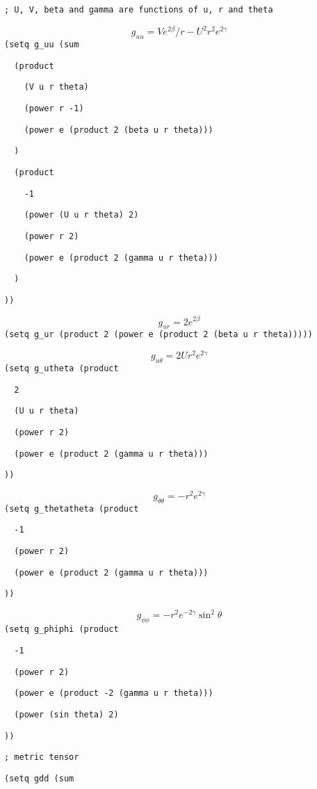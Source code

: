 {\tt ;\ U,\ V,\ beta\ and\ gamma\ are\ functions\ of\ u,\ r\ and\ theta}

$$g_{uu}=Ve^{2\beta}/r-U^2r^2e^{2\gamma}$$
{\tt (setq\ g\_uu\ (sum}

{\tt \ \ (product}

{\tt \ \ \ \ (V\ u\ r\ theta)}

{\tt \ \ \ \ (power\ r\ -1)}

{\tt \ \ \ \ (power\ e\ (product\ 2\ (beta\ u\ r\ theta)))}

{\tt \ \ )}

{\tt \ \ (product}

{\tt \ \ \ \ -1}

{\tt \ \ \ \ (power\ (U\ u\ r\ theta)\ 2)}

{\tt \ \ \ \ (power\ r\ 2)}

{\tt \ \ \ \ (power\ e\ (product\ 2\ (gamma\ u\ r\ theta)))}

{\tt \ \ )}

{\tt ))}

$$g_{ur}=2e^{2\beta}$$
{\tt (setq\ g\_ur\ (product\ 2\ (power\ e\ (product\ 2\ (beta\ u\ r\ theta)))))}

$$g_{u\theta}=2Ur^2e^{2\gamma}$$
{\tt (setq\ g\_utheta\ (product}

{\tt \ \ 2}

{\tt \ \ (U\ u\ r\ theta)}

{\tt \ \ (power\ r\ 2)}

{\tt \ \ (power\ e\ (product\ 2\ (gamma\ u\ r\ theta)))}

{\tt ))}

$$g_{\theta\theta}=-r^2e^{2\gamma}$$
{\tt (setq\ g\_thetatheta\ (product}

{\tt \ \ -1}

{\tt \ \ (power\ r\ 2)}

{\tt \ \ (power\ e\ (product\ 2\ (gamma\ u\ r\ theta)))}

{\tt ))}

$$g_{\phi\phi}=-r^2e^{-2\gamma}\sin^2\theta$$
{\tt (setq\ g\_phiphi\ (product}

{\tt \ \ -1}

{\tt \ \ (power\ r\ 2)}

{\tt \ \ (power\ e\ (product\ -2\ (gamma\ u\ r\ theta)))}

{\tt \ \ (power\ (sin\ theta)\ 2)}

{\tt ))}

{\tt ;\ metric\ tensor}

{\tt (setq\ gdd\ (sum}

